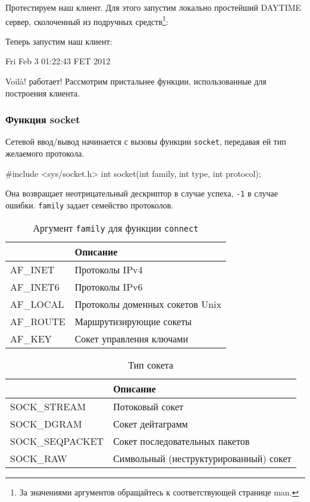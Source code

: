 Протестируем наш клиент. Для этого запустим локально простейший DAYTIME сервер, сколоченный из подручных средств\footnote{За значениями аргументов обращайтесь к соответствующей странице man.}:
\begin{plainlst}{}{}
\end{plainlst}

Теперь запустим наш клиент:
\begin{plainlst}{}{}
Fri Feb  3 01:22:43 FET 2012
\end{plainlst}

Voilà! работает! Рассмотрим пристальнее функции, использованные для построения клиента.

\subsubsection{Функция socket}
Сетевой ввод/вывод начинается с вызовы функции \lstinline{socket}, передавая ей тип желаемого протокола.
\begin{clst}{}{}
#include <sys/socket.h>
int socket(int family, int type, int protocol);
\end{clst}

Она возвращает неотрицательный дескриптор в случае успеха, \lstinline{-1} в случае ошибки. \lstinline{family} задает семейство протоколов.
\begin{table}[h!]
  \caption{Аргумент \lstinline{family} для функции \lstinline{connect}}
  \begin{center}
    \begin{tabular}{p{2.5cm}l}
      \toprule
      & \textbf{Описание} \\
      \midrule
      AF\_INET & Протоколы IPv4 \\
      AF\_INET6 & Протоколы IPv6 \\
      AF\_LOCAL & Протоколы доменных сокетов Unix \\
      AF\_ROUTE & Маршрутизирующие сокеты \\
      AF\_KEY & Сокет управления ключами \\
      \bottomrule
    \end{tabular}
  \end{center}
\end{table}

\begin{table}[h!]
  \caption{Тип сокета}
  \begin{center}
    \begin{tabular}{p{3.5cm}l}
      \toprule
      & \textbf{Описание} \\
      \midrule
      SOCK\_STREAM & Потоковый сокет \\
      SOCK\_DGRAM & Сокет дейтаграмм \\
      SOCK\_SEQPACKET & Сокет последовательных пакетов \\
      SOCK\_RAW & Символьный (неструктурированный) сокет \\
      \bottomrule
    \end{tabular}
  \end{center}
\end{table}

